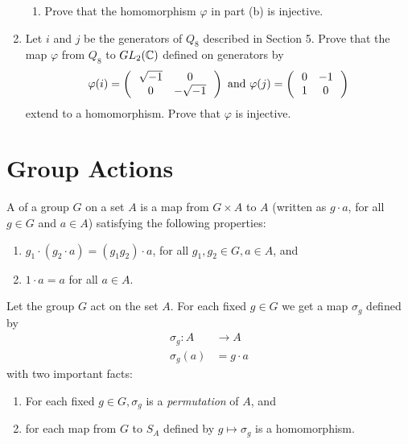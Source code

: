 \documentclass[10pt,a4paper]{report}
\begin{document}
\begin{enumerate}
\begin{enumerate}
		\item Prove that the homomorphism $\varphi$ in part (b) is injective.
		
	\end{enumerate}
	
	\item Let $i$ and $j$ be the generators of $Q_8$ described in Section 5.  Prove that the map $\varphi$ from $Q_8$ to $GL_2(\mathbb{C})$ defined on generators by 
	\begin{align*}
		\varphi(i) = \left (\,  \begin{array}{c c} \sqrt{-1}&0 \\ 0 & -\sqrt{-1} \end{array}  \,\right ) \text{ and } \varphi(j)=\left (\,  \begin{array}{c c} 0&-1 \\ 1 & 0 \end{array}  \,\right )
	\end{align*}extend to a homomorphism.  Prove that $\varphi$ is injective.
	
\end{enumerate}

\section{Group Actions}

\begin{definition} A  of a group $G$ on a set $A$ is a map from $G \times A$ to $A$ (written as $g\cdot a$, for all $g \in G$ and $a \in A$) satisfying the following properties:
\begin{enumerate}
	\item $g_1\cdot (g_2 \cdot a) = (g_1g_2)\cdot a$, for all $g_1, g_2 \in G, a \in A$, and 
	\item $1\cdot a = a$ for all $a \in A$.
\end{enumerate}
\end{definition}

\begin{remark} Let the group $G$ act on the set $A$.  For each fixed $g\in G$ we get a map $\sigma_g$ defined by
\begin{align*}
	\sigma_g: A &\to A\\
	\sigma_g(a)&=g\cdot a
\end{align*}with two important facts:
\begin{enumerate}
	\item For each fixed $g \in G, \sigma_g$ is a \textit{permutation} of $A$, and 
	\item for each map from $G$ to $S_A$ defined by $g \mapsto \sigma_g$ is a homomorphism.
\end{enumerate}
\end{remark}
\end{document}
